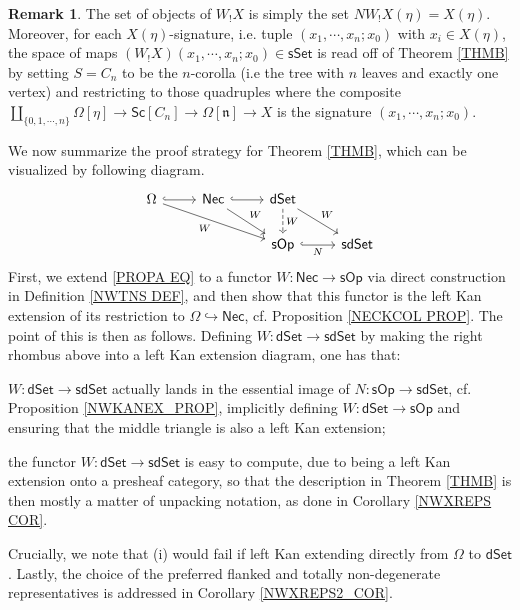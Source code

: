 \documentclass[a4paper,10pt]{article}%
\numberwithin{equation}{section}
\numberwithin{figure}{section}
\theoremstyle{definition} %
\newtheorem{remark}[equation]{Remark}%
\newcommand{\sOp}{\mathsf{sOp}}
\newcommand{\dSet}{\mathsf{dSet}}
\begin{document}
\begin{remark}\label{READMAPSP REM}
	The set of objects of $W_! X$ is simply the set
	$NW_! X(\eta) = X(\eta)$.
	Moreover, for each $X(\eta)$-signature, 
	i.e. tuple $(x_1,\cdots,x_n;x_0)$ with $x_i \in X(\eta)$,
	the space of maps
	$(W_! X)(x_1,\cdots,x_n;x_0) \in \mathsf{sSet}$
	is read off of Theorem \ref{THMB}
	by setting $S=C_n$ to be the $n$-corolla
	(i.e the tree with $n$ leaves and exactly one vertex)
	and restricting to those quadruples where the composite
	$\coprod_{\{0,1,\cdots,n\}}\Omega[\eta] 
	\to \mathsf{Sc}[C_n] \to 
	\Omega[\mathfrak{n}] \to X$
	is the signature $(x_1,\cdots,x_n;x_0)$.
\end{remark}



We now summarize the proof strategy for Theorem \ref{THMB},
which can be visualized by following diagram.
\begin{equation}\label{KEYSTRAT EQ}
\begin{tikzcd}
\Omega \ar[hookrightarrow]{r}
\ar{rrd}[swap]{W} 
&
\mathsf{Nec}
\ar[hookrightarrow]{r}
\ar{rd}{W}
&
\mathsf{dSet} \ar{rd}{W}
\ar[dashed]{d}{W}
\\
&&
\mathsf{sOp} \ar[hookrightarrow]{r}[swap]{N} &
\mathsf{sdSet}
\end{tikzcd}
\end{equation}
First, 
we extend \eqref{PROPA EQ} to a functor
$W \colon \mathsf{Nec} \to \sOp$
via direct construction
in Definition \ref{NWTNS DEF},
and then show that this functor is the left Kan extension of 
its restriction to 
$\Omega \hookrightarrow \mathsf{Nec}$,
cf. Proposition \ref{NECKCOL PROP}.
The point of this is then as follows.
Defining $W \colon \mathsf{dSet} \to \mathsf{sdSet}$
by making the right rhombus above into a left Kan extension diagram,
one has that:
\begin{enumerate*}
\item
$W \colon \mathsf{dSet} \to \mathsf{sdSet}$
actually lands in the essential image
of $N \colon \sOp \to \mathsf{sdSet}$,
cf. Proposition \ref{NWKANEX_PROP},
implicitly defining 
$W \colon \mathsf{dSet} \to \sOp$
and ensuring that the middle triangle is also a left Kan extension;
\item
the functor 
$W \colon \mathsf{dSet} \to \mathsf{sdSet}$
is easy to compute, due to being a left Kan extension onto a presheaf category,
so that the description in Theorem \ref{THMB}
is then mostly a matter of unpacking notation,
as done in Corollary \ref{NWXREPS COR}.
\end{enumerate*}
Crucially, we note that (i) would fail
if left Kan extending directly from 
$\Omega$ to $\dSet$. 
Lastly, the choice of the preferred 
flanked and totally non-degenerate 
representatives is addressed in 
Corollary \ref{NWXREPS2_COR}.
\end{document}
